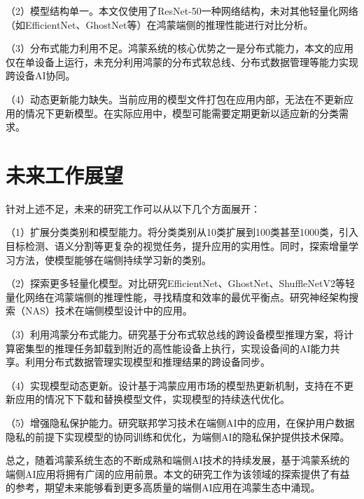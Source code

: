 （2）模型结构单一。本文仅使用了ResNet-50一种网络结构，未对其他轻量化网络（如EfficientNet、GhostNet等）在鸿蒙端侧的推理性能进行对比分析。

（3）分布式能力利用不足。鸿蒙系统的核心优势之一是分布式能力，本文的应用仅在单设备上运行，未充分利用鸿蒙的分布式软总线、分布式数据管理等能力实现跨设备AI协同。

（4）动态更新能力缺失。当前应用的模型文件打包在应用内部，无法在不更新应用的情况下更新模型。在实际应用中，模型可能需要定期更新以适应新的分类需求。

\section{未来工作展望}

针对上述不足，未来的研究工作可以从以下几个方面展开：

（1）扩展分类类别和模型能力。将分类类别从10类扩展到100类甚至1000类，引入目标检测、语义分割等更复杂的视觉任务，提升应用的实用性。同时，探索增量学习方法，使模型能够在端侧持续学习新的类别。

（2）探索更多轻量化模型。对比研究EfficientNet、GhostNet、ShuffleNetV2等轻量化网络在鸿蒙端侧的推理性能，寻找精度和效率的最优平衡点。研究神经架构搜索（NAS）技术在端侧模型设计中的应用。

（3）利用鸿蒙分布式能力。研究基于分布式软总线的跨设备模型推理方案，将计算密集型的推理任务卸载到附近的高性能设备上执行，实现设备间的AI能力共享。利用分布式数据管理实现模型和推理结果的跨设备同步。

（4）实现模型动态更新。设计基于鸿蒙应用市场的模型热更新机制，支持在不更新应用的情况下下载和替换模型文件，实现模型的持续迭代优化。

（5）增强隐私保护能力。研究联邦学习技术在端侧AI中的应用，在保护用户数据隐私的前提下实现模型的协同训练和优化，为端侧AI的隐私保护提供技术保障。

总之，随着鸿蒙系统生态的不断成熟和端侧AI技术的持续发展，基于鸿蒙系统的端侧AI应用将拥有广阔的应用前景。本文的研究工作为该领域的探索提供了有益的参考，期望未来能够看到更多高质量的端侧AI应用在鸿蒙生态中涌现。